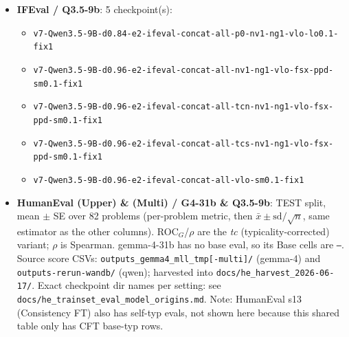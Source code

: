 \documentclass[10pt]{article}
\begin{document}
\begin{itemize}
\begin{itemize}
\item \texttt{v7-gemma-2-9b-it-d1.94-e2-ifeval-concat-all-tcs-nv1-ng1-vlo-fsx-ppd-sm0.1-fix1}
\item \texttt{v7-google--gemma-2-9b-it-delta0.98-epoch2--ifeval-concat-all--d2g--random--alpha1.0--full-completion--pref0.0--nllv1.0--nllg1.0--cft--labelonly0.1--fix1\_merged}
\item \texttt{v7-google--gemma-2-9b-it-delta1.29-epoch2--ifeval-concat-all--d2g--random--alpha1.0--full-completion--pref0.0--nllv1.0--nllg1.0--labelonly0.1--fix1\_merged}
\item \texttt{v7-google--gemma-2-9b-it-delta1.38-epoch2--ifeval-concat-all--d2g--random--alpha1.0--full-completion--semi0.1--fix1\_merged}
\end{itemize}
\item \textbf{IFEval / Q3.5-9b}: 5 checkpoint(s):
\begin{itemize}\tiny
\item \texttt{v7-Qwen3.5-9B-d0.84-e2-ifeval-concat-all-p0-nv1-ng1-vlo-lo0.1-fix1}
\item \texttt{v7-Qwen3.5-9B-d0.96-e2-ifeval-concat-all-nv1-ng1-vlo-fsx-ppd-sm0.1-fix1}
\item \texttt{v7-Qwen3.5-9B-d0.96-e2-ifeval-concat-all-tcn-nv1-ng1-vlo-fsx-ppd-sm0.1-fix1}
\item \texttt{v7-Qwen3.5-9B-d0.96-e2-ifeval-concat-all-tcs-nv1-ng1-vlo-fsx-ppd-sm0.1-fix1}
\item \texttt{v7-Qwen3.5-9B-d0.96-e2-ifeval-concat-all-vlo-sm0.1-fix1}
\end{itemize}

\item \textbf{HumanEval (Upper) \& (Multi) / G4-31b \& Q3.5-9b}: TEST split, mean $\pm$ SE over
82 problems (per-problem metric, then $\bar{x}\pm \mathrm{sd}/\sqrt{n}$, same estimator as the other
columns). ROC$_G$/$\rho$ are the \emph{tc} (typicality-corrected) variant; $\rho$ is Spearman.
gemma-4-31b has no base eval, so its Base cells are \texttt{---}. Source score CSVs:
\texttt{outputs\_gemma4\_mll\_tmp[-multi]/} (gemma-4) and \texttt{outputs-rerun-wandb/} (qwen);
harvested into \texttt{docs/he\_harvest\_2026-06-17/}. Exact checkpoint dir names per setting:
see \texttt{docs/he\_trainset\_eval\_model\_origins.md}. Note: HumanEval s13 (Consistency FT) also
has self-typ evals, not shown here because this shared table only has CFT base-typ rows.
\end{itemize}
\end{document}
